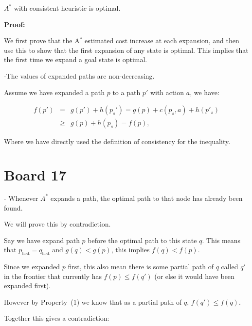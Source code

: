 \documentclass[10pt]{article}
\begin{document}
\begin{theorem}
  $A^*$  with consistent heuristic is optimal.
\end{theorem}

\noindent \textbf{Proof:}

We first prove that the A$^*$ estimated cost increase at each expansion, and then use this to show that the first expansion of any state is optimal. This implies that the first time we expand a goal state is optimal.  

-The values of expanded paths are non-decreasing.

Assume we have expanded a path $p$ to a path $p'$ with action $a$, we have:

\begin{eqnarray*}
f(p') &=& g(p') + h(p_s') = g(p) + c(p_s, a) + h(p'_s)  \\
&\geq & g(p) + h(p_s) =f(p),
\end{eqnarray*}

\noindent Where we have directly used the definition of consistency for the inequality.

\section{Board 17}

- Whenever $A^*$ expands a path, the optimal path to that node has already been found. 

We will prove this by contradiction. 

Say we have expand path $p$ before the optimal path to this state $q$. This means that $p_{\mathrm{last}} =q_\mathrm{last}$ and  $g(q) < g(p)$, this implies $f(q) < f(p)$.

Since we expanded $p$ first, this also mean there is some partial path
of $q$ called $q'$ in the frontier that currently has $f(p) \leq f(q')$ (or else it
would have been expanded first).

However by Property~(1) we know that as a partial path of $q$, $f(q') \leq f(q)$. 

Together this gives a contradiction:



\QED

\end{document}
